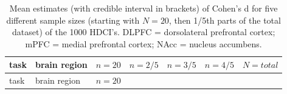 \documentclass[
  letterpaper,
  DIV=11,
  numbers=noendperiod]{scrartcl}
\begin{document}
\begin{longtable}[]{@{}
  >{\raggedright\arraybackslash}p{}
  >{\raggedright\arraybackslash}p{}
  >{\raggedright\arraybackslash}p{}
  >{\raggedright\arraybackslash}p{}
  >{\raggedright\arraybackslash}p{}
  >{\raggedright\arraybackslash}p{}
  >{\raggedright\arraybackslash}p{}@{}}
\caption{Mean estimates (with credible interval in brackets) of Cohen's
d for five different sample sizes (starting with \(N = 20\), then 1/5th
parts of the total dataset) of the 1000 HDCI's. DLPFC = dorsolateral
prefrontal cortex; mPFC = medial prefrontal cortex; NAcc = nucleus
accumbens.}\label{tbl-2}\tabularnewline
\toprule\noalign{}
\begin{minipage}[b]{\linewidth}\raggedright
task
\end{minipage} & \begin{minipage}[b]{\linewidth}\raggedright
brain region
\end{minipage} & \begin{minipage}[b]{\linewidth}\raggedright
\(n = 20\)
\end{minipage} & \begin{minipage}[b]{\linewidth}\raggedright
\(n = 2/5\)
\end{minipage} & \begin{minipage}[b]{\linewidth}\raggedright
\(n = 3/5\)
\end{minipage} & \begin{minipage}[b]{\linewidth}\raggedright
\(n = 4/5\)
\end{minipage} & \begin{minipage}[b]{\linewidth}\raggedright
\(N = total\)
\end{minipage} \\
\midrule\noalign{}
\endfirsthead
\toprule\noalign{}
\begin{minipage}[b]{\linewidth}\raggedright
task
\end{minipage} & \begin{minipage}[b]{\linewidth}\raggedright
brain region
\end{minipage} & \begin{minipage}[b]{\linewidth}\raggedright
\(n = 20\)
\end{minipage} & \begin{minipage}[b]{\linewidth}\raggedright

\end{minipage}
\end{longtable}
\end{document}
